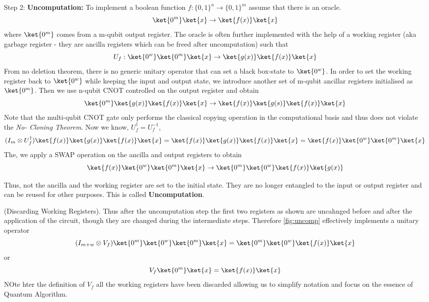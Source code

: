 \documentclass[12pt, oneside]{book}
\theoremstyle{definition}
\theoremstyle{definition}
\theoremstyle{remark}
\begin{document}
Step 2: \textbf{Uncomputation: }To implement a boolean function $f:\{0,1\}^n \rightarrow \{0,1\}^m$ assume that there is an oracle.
\[
\ket{0^m}\ket{x}\rightarrow \ket{f(x)}\ket{x}\]
where $\ket{0^m}$ comes from a m-qubit output register. The oracle is often further implemented
with the help of a working register (aka garbage register - they are ancilla registers which can be freed after uncomputation) such that
\[U_f:\ket{0^w}\ket{0^m}\ket{x}\rightarrow \ket{g(x)}\ket{f(x)}\ket{x}\]
From no deletion theorem, there is no generic unitary operator that can set a black box-state to $\ket{0^w}$.
In order to set the working register back to $\ket{0^w}$ while keeping the input and output state, we introduce another set of m-qubit ancillar registers
initialised as $\ket{0^m}$. Then we use n-qubit CNOT controlled on the output register and obtain
\[\ket{0^m}\ket{g(x)}\ket{f(x)}\ket{x} \rightarrow \ket{f(x)}\ket{g(s)}\ket{f(x)}\ket{x}\]
Note that the multi-qubit CNOT gate only performs the classical copying operation in the computational basis and thus does not violate 
the \textit{No- Cloning Theorem}.
Now we know, $U_f^{\dagger}=U_f^{-1}$,
\[ (I_m \otimes U_f^{\dagger})\ket{f(x)}\ket{g(x)}\ket{f(x)}\ket{x} = \ket{f(x)}\ket{g(x)}\ket{f(x)}\ket{x} =\ket{f(x)}\ket{0^w}\ket{0^m}\ket{x}\]
The, we apply a SWAP operation on the ancilla and output registers to obtain 
\[\ket{f(x)}\ket{0^w}\ket{0^m}\ket{x}\rightarrow\ket{0^m}\ket{0^w}\ket{f(x)}\ket{g(x)}\]

Thus, not the ancilla and the working register are set to the initial state. They are no longer entangled to the input or output register and can be reused for other 
purposes. This is called \textbf{Uncomputation}.

(Discarding Working Registers). Thus after the uncomputation step the first two registers as shown are uncahnged before and after the application of the circuit, though 
they are changed during the intermediate steps. Therefore \ref{fig:uncomp} effectively implements a unitary operator
\[ (I_{m+w} \otimes V_f)\ket{0^m}\ket{0^w}\ket{0^m}\ket{x}=\ket{0^m}\ket{0^w}\ket{f(x)}\ket{x}\]
or
\[V_f\ket{0^m}\ket{x}=\ket{f(x)}\ket{x}\]
NOte hter the definition of $V_f$ all the working registers have been discarded allowing us to simplify notation and focus on the essence of Quantum Algorithm.
\end{document}
